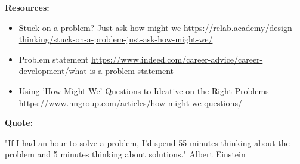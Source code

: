 \textbf{Resources:}

\begin{itemize}
\item Stuck on a problem? Just ask how might we \url{https://relab.academy/design-thinking/stuck-on-a-problem-just-ask-how-might-we/}
\item Problem statement \url{https://www.indeed.com/career-advice/career-development/what-is-a-problem-statement}
\item Using 'How Might We' Questions to Ideative on the Right Problems \url{https://www.nngroup.com/articles/how-might-we-questions/}
\end{itemize}

\textbf{Quote:}

"If I had an hour to solve a problem, I'd spend 55 minutes thinking about the problem and 5 minutes thinking about solutions." Albert Einstein

